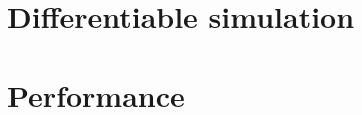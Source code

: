 \documentclass[11pt,a4paper,oneside]{report}
\begin{document}
\part{Differentiable simulation}


\part{Performance}



\end{document}

